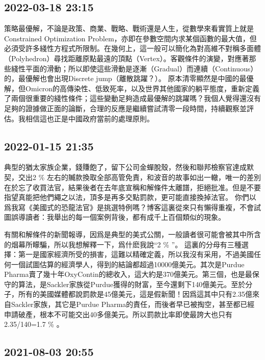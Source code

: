 \documentclass[twocolumn]{ctexart}
\begin{document}
\subsection*{2022-03-18 23:15}

策略最優解，不論是政策、商業、戰略、戰術還是人生，從數學來看實質上就是Constrained Optimization Problem，亦即在參數空間内求某個函數的最大值，但必須受許多綫性方程式所限制。在幾何上，這一般可以簡化為對高維不對稱多面體（Polyhedron）尋找距離原點最遠的頂點（Vertex）。客觀條件的演變，對應著那些綫性平面的滑動；所以即使這些滑動是逐漸（Gradual）而連續（Continuous）的，最優解也會出現Discrete jump（離散跳躍？）。
原本清零顯然是中國的最優解，但Omicron的高傳染性、低致死率，以及世界其他國家的躺平態度，重新定義了兩個很重要的綫性條件；這些變動足夠造成最優解的跳躍嗎？我個人覺得還沒有足夠的證據做正面的論斷，合理的反應是繼續嘗試清零一段時間，持續觀察並評估。我相信這也正是中國政府當前的處理原則。
\subsection*{2022-01-15 21:35}

典型的猶太家族企業，錢賺飽了，留下公司金蟬脫殼，然後和聯邦檢察官達成默契，交出2 \% 左右的贓款換取全部高管免責，和波音的故事如出一轍，唯一的差別在於忘了收買法官，結果後者在去年底宣稱和解條件太離譜，拒絕批准。但是不要指望真能把他們繩之以法，頂多是再多交點罰款，更可能直接換掉法官。
你們以爲我寫《美國式的恐龍法官》是挑選特例嗎？博客這裏從來只有懶得重複，不會試圖誤導讀者：我舉出的每一個案例背後，都有成千上百個類似的現象。

有關和解條件的新聞報導，因爲是典型的美式公關，一般讀者很可能會被其中所含的烟幕所矇騙，所以我想解釋一下，爲什麽我說“2 \% ”。
這裏的分母有三種選擇：第一是國家經濟所受的損害，這難以精確定義，所以我沒有采用，不過美國任何一個試圖估算的經濟學人，得到的結論都超過10000億美元。其次是Purdue Pharma賣了幾十年OxyContin的總收入，這大約是370億美元。第三個，也是最保守的算法，是Sackler家族從Purdue獲得的財富，至今還剩下140億美元。至於分子，所有的美國媒體都說罰款是45億美元，這是假新聞！因爲這其中只有2.35億來自Sackler家族，其它是Purdue Pharma的責任，而後者早已被掏空，甚至都已經申請破產，根本不可能交出40多億美元。所以罰款比率即使最誇大也只有2.35/140=1.7 \% 。
\subsection*{2021-08-03 20:55}
\end{document}
